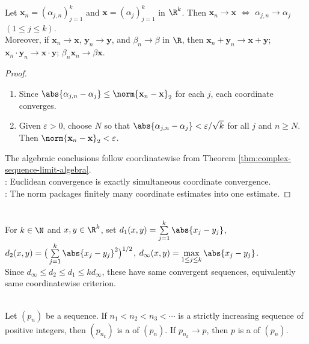 \begin{theorem} \label{thm:rk-sequence-coordinate-convergence} \\
Let $\mathbf{x}_n=(\alpha_{j,n})_{j=1}^k$ and $\mathbf{x}=(\alpha_j)_{j=1}^k$ in $\R^k$. Then $\mathbf{x}_n\to\mathbf{x}$ $\Longleftrightarrow$ $\alpha_{j,n}\to\alpha_j$ $(1\leq j\leq k)$.\\
Moreover, if $\mathbf{x}_n\to\mathbf{x}$, $\mathbf{y}_n\to\mathbf{y}$, and $\beta_n\to\beta$ in $\R$, then $\mathbf{x}_n+\mathbf{y}_n\to\mathbf{x}+\mathbf{y}$; $\mathbf{x}_n\cdot\mathbf{y}_n\to\mathbf{x}\cdot\mathbf{y}$; $\beta_n\mathbf{x}_n\to\beta\mathbf{x}$.
\begin{proof}
\begin{enumerate}[label=\roman*.]
\setlength{\itemsep}{0pt}
\item[$(\Rightarrow)$] Since $\abs{\alpha_{j,n}-\alpha_j}\leq\norm{\mathbf{x}_n-\mathbf{x}}_2$ for each $j$, each coordinate converges.
\item[$(\Leftarrow)$] Given $\varepsilon>0$, choose $N$ so that $\abs{\alpha_{j,n}-\alpha_j}<\varepsilon/\sqrt{k}$ for all $j$ and $n\geq N$. Then $\norm{\mathbf{x}_n-\mathbf{x}}_2<\varepsilon$.
\end{enumerate}
The algebraic conclusions follow coordinatewise from Theorem \ref{thm:complex-sequence-limit-algebra}.\\
: Euclidean convergence is exactly simultaneous coordinate convergence.\\
: The norm packages finitely many coordinate estimates into one estimate.
\end{proof}
\end{theorem}

\begin{remark} \label{rem:coordinate-metric-convergence-equivalence} \\
For $k\in\N$ and $x,y\in\R^k$, set $d_1(x,y)=\sum\limits_{j=1}^k\abs{x_j-y_j}$, $d_2(x,y)=\big(\sum\limits_{j=1}^k\abs{x_j-y_j}^2\big)^{1/2}$,  $d_\infty(x,y)=\max\limits_{1\leq j\leq k}\abs{x_j-y_j}$.\\
Since $d_\infty\leq d_2\leq d_1\leq k d_\infty$, these have same convergent sequences, equivalently same coordinatewise criterion.
\end{remark}

\begin{definition} \label{def:subsequence-and-subsequential-limit} \\
Let $(p_n)$ be a sequence. If $n_1<n_2<n_3<\cdots$ is a strictly increasing sequence of positive integers, then $(p_{n_k})$ is a  of $(p_n)$. If $p_{n_k}\to p$, then $p$ is a  of $(p_n)$.
\end{definition}

